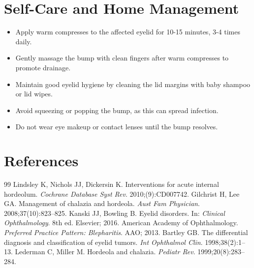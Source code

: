 \section*{Self-Care and Home Management}
\begin{itemize}
  \item Apply warm compresses to the affected eyelid for 10-15 minutes, 3-4 times daily.
  \item Gently massage the bump with clean fingers after warm compresses to promote drainage.
  \item Maintain good eyelid hygiene by cleaning the lid margins with baby shampoo or lid wipes.
  \item Avoid squeezing or popping the bump, as this can spread infection.
  \item Do not wear eye makeup or contact lenses until the bump resolves.
\end{itemize}

\section*{References}
\begin{thebibliography}{99}
Lindsley K, Nichols JJ, Dickersin K. Interventions for acute internal hordeolum. \textit{Cochrane Database Syst Rev}. 2010;(9):CD007742.
Gilchrist H, Lee GA. Management of chalazia and hordeola. \textit{Aust Fam Physician}. 2008;37(10):823--825.
Kanski JJ, Bowling B. Eyelid disorders. In: \textit{Clinical Ophthalmology}. 8th ed. Elsevier; 2016.
American Academy of Ophthalmology. \textit{Preferred Practice Pattern: Blepharitis}. AAO; 2013.
Bartley GB. The differential diagnosis and classification of eyelid tumors. \textit{Int Ophthalmol Clin}. 1998;38(2):1--13.
Lederman C, Miller M. Hordeola and chalazia. \textit{Pediatr Rev}. 1999;20(8):283--284.
\end{thebibliography}

